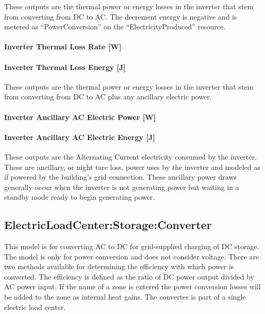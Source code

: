 These outputs are the thermal power or energy losses in the inverter that stem from converting from DC to AC. The decrement energy is negative and is metered as ``PowerConversion'' on the ``ElectricityProduced'' resource.

\paragraph{Inverter Thermal Loss Rate {[}W{]}}\label{inverter-thermal-loss-rate-w}

\paragraph{Inverter Thermal Loss Energy {[}J{]}}\label{inverter-thermal-loss-energy-j}

These outputs are the thermal power or energy losses in the inverter that stem from converting from DC to AC plus any ancillary electric power.

\paragraph{Inverter Ancillary AC Electric Power {[}W{]}}\label{inverter-ancillary-ac-electric-power-w}

\paragraph{Inverter Ancillary AC Electric Energy {[}J{]}}\label{inverter-ancillary-ac-electric-energy-j}

These outputs are the Alternating Current electricity consumed by the inverter. These are ancillary, or night tare loss, power uses by the inverter and modeled as if powered by the building's grid connection. These ancillary power draws generally occur when the inverter is not generating power but waiting in a standby mode ready to begin generating power.

\subsection{ElectricLoadCenter:Storage:Converter}\label{electricloadcenterstorageconverter}

This model is for converting AC to DC for grid-supplied charging of DC storage. The model is only for power conversion and does not consider voltage. There are two methods available for determining the efficiency with which power is converted. The efficiency is defined as the ratio of DC power output divided by AC power input. If the name of a zone is entered the power conversion losses will be added to the zone as internal heat gains. The converter is part of a single electric load center.

